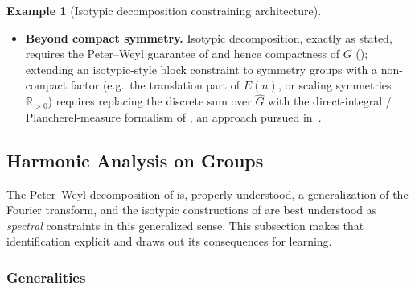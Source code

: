 \documentclass[11pt]{article}
\theoremstyle{plain}
\theoremstyle{definition}
\newtheorem{Example}{Example}[section]
\begin{document}
\begin{Example}[Isotypic decomposition constraining architecture]
\begin{itemize}
    network of the same width---is the subject of the universal
    approximation analysis in~\citep{yarotsky2018r}.
    \item \textbf{Beyond compact symmetry.} Isotypic decomposition, exactly
    as stated, requires the Peter--Weyl guarantee of
     and hence compactness of $G$
    (); extending an isotypic-style
    block constraint to symmetry groups with a non-compact factor (e.g.\ the
    translation part of $E(n)$, or scaling symmetries
    $\mathbb{R}_{>0}$) requires replacing the discrete sum over
    $\widehat{G}$ with the direct-integral / Plancherel-measure formalism
    of , an approach pursued
    in~\citep{gibson2024}.
\end{itemize}
\end{Example}

\subsection{Harmonic Analysis on Groups}
\label{subsec:harmonic-analysis}

The Peter--Weyl decomposition of  is, properly
understood, a generalization of the Fourier transform, and the isotypic
constructions of  are best understood
as \emph{spectral} constraints in this generalized sense. This subsection
makes that identification explicit and draws out its consequences for
learning.

\subsubsection{Generalities}
\label{subsubsec:harmonic-analysis-generalities}
\end{document}
